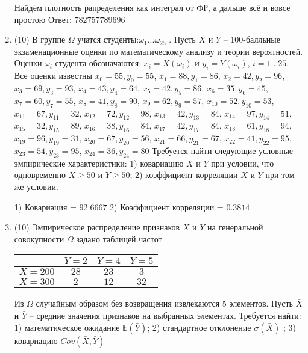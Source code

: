 \documentclass[a4paper,12pt]{article}
\begin{document}
\begin{enumerate}
Найдём плотность рапределения как интеграл от ФР, а дальше всё и вовсе простою Ответ: $782757789696$


\item


(10) В группе $\Omega$ учатся студенты:$\omega _{1}...\omega _{25}$ . Пусть $X$ и $Y$ – 100-балльные экзаменационные оценки по
математическому анализу и теории вероятностей. Оценки $\omega _{i}$ студента обозначаются: $x _{i} = X(\omega _{i})$ и $y _{i} = Y(\omega _{i})$, $i = 1...25$. Все оценки известны
$x _{0} = 55, y _{0} = 55$, $x _{1} = 88, y _{1} = 86$, $x _{2} = 42, y _{2} = 96$, $x _{3} = 69, y _{3} = 93$, $x _{4} = 43, y _{4} = 64$, $x _{5} = 42, y _{5} = 86$, $x _{6} = 35, y _{6} = 45$, $x _{7} = 60, y _{7} = 55$, $x _{8} = 41, y _{8} = 90$, $x _{9} = 62, y _{9} = 57$, $x _{10} = 52, y _{10} = 53$, $x _{11} = 67, y _{11} = 32$, $x _{12} = 72, y _{12} = 98$, $x _{13} = 42, y _{13} = 84$, $x _{14} = 97, y _{14} = 51$, $x _{15} = 32, y _{15} = 89$, $x _{16} = 38, y _{16} = 84$, $x _{17} = 42, y _{17} = 84$, $x _{18} = 61, y _{18} = 94$, $x _{19} = 96, y _{19} = 31$, $x _{20} = 67, y _{20} = 56$, $x _{21} = 66, y _{21} = 67$, $x _{22} = 41, y _{22} = 95$, $x _{23} = 54, y _{23} = 95$, $x _{24} = 36, y _{24} = 80$
Требуется
найти следующие условные эмпирические характеристики: 1) ковариацию $X$ и $Y$ при условии, что одновременно $X \geqslant 50$
 и $Y \geqslant 50$; 2) коэффициент корреляции $X$ и $Y$ при том же условии.




1) Ковариация = $92.6667$
2) Коэффициент корреляции = $0.3814$


\item


(10) Эмпирическое распределение признаков $X$ и $Y$ на генеральной совокупности $\Omega$ задано таблицей частот  
 
\begin{tabular}{ | c | c | c | c | }
\hline
 & $Y = 2$ & $Y = 4$ & $Y = 5$  \\ \hline
$X = 200$ & $28$ & $23$ & $3$\\ \hline
$X = 300$ & $2$ & $12$ & $32$\\
\hline
\end{tabular}

Из $\Omega$ случайным образом без возвращения извлекаются $5$ элементов. 
Пусть $\bar X$ и $\bar Y$ – средние значения признаков на выбранных элементах. 
Требуется найти: 1) математическое ожидание $\mathbb{E}(\bar Y)$; 2) стандартное отклонение $\sigma(\bar X)$ ; 
3) ковариацию $Cov(\bar X, \bar Y)$





\end{enumerate}
\end{document}
